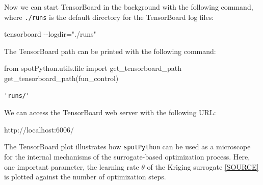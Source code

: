 \documentclass[
  letterpaper,
  DIV=11,
  numbers=noendperiod]{scrreprt}
\newenvironment{Shaded}{\begin{snugshade}}{\end{snugshade}}
\newcommand{\BuiltInTok}[1]{\textcolor[rgb]{0.00,0.23,0.31}{#1}}
\newcommand{\ImportTok}[1]{\textcolor[rgb]{0.00,0.46,0.62}{#1}}
\newcommand{\NormalTok}[1]{\textcolor[rgb]{0.00,0.23,0.31}{#1}}
\begin{document}
Now we can start TensorBoard in the background with the following
command, where \texttt{./runs} is the default directory for the
TensorBoard log files:

\begin{Shaded}
\begin{Highlighting}[]
\NormalTok{tensorboard {-}{-}logdir="./runs"}
\end{Highlighting}
\end{Shaded}

\begin{tcolorbox}[enhanced jigsaw, left=2mm, toprule=.15mm, colframe=quarto-callout-tip-color-frame, leftrule=.75mm, title=\textcolor{quarto-callout-tip-color}{\faLightbulb}\hspace{0.5em}{Tip: TENSORBOARD\_PATH}, toptitle=1mm, opacitybacktitle=0.6, arc=.35mm, titlerule=0mm, opacityback=0, bottomtitle=1mm, coltitle=black, rightrule=.15mm, colback=white, colbacktitle=quarto-callout-tip-color!10!white, breakable, bottomrule=.15mm]

The TensorBoard path can be printed with the following command:

\begin{Shaded}
\begin{Highlighting}[]
\ImportTok{from}\NormalTok{ spotPython.utils.}\BuiltInTok{file} \ImportTok{import}\NormalTok{ get\_tensorboard\_path}
\NormalTok{get\_tensorboard\_path(fun\_control)}
\end{Highlighting}
\end{Shaded}

\begin{verbatim}
'runs/'
\end{verbatim}

\end{tcolorbox}

We can access the TensorBoard web server with the following URL:

\begin{Shaded}
\begin{Highlighting}[]
\NormalTok{http://localhost:6006/}
\end{Highlighting}
\end{Shaded}

The TensorBoard plot illustrates how \texttt{spotPython} can be used as
a microscope for the internal mechanisms of the surrogate-based
optimization process. Here, one important parameter, the learning rate
\(\theta\) of the Kriging surrogate
\href{https://github.com/sequential-parameter-optimization/spotPython/blob/main/src/spotPython/build/kriging.py}{{[}SOURCE{]}}
is plotted against the number of optimization steps.
\end{document}
